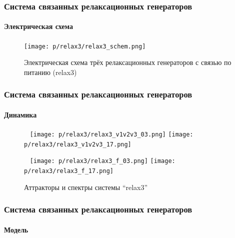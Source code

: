 \documentclass[10pt,utf8]{beamer}
\begin{document}

\begin{frame}
  \frametitle{Система связанных релаксационных генераторов}
  \framesubtitle{Электрическая схема}

  \begin{figure}[h!]
  \begin{center}
    \texttt{[image: p/relax3/relax3\_schem.png]}
  \end{center}
    \caption{Электрическая схема трёх релаксационных генераторов с связью по питанию (relax3)}
  \label{atu:f:relax3_schem}
  \end{figure}

\end{frame}




\begin{frame}
  \frametitle{Система связанных релаксационных генераторов}
  \framesubtitle{Динамика}

  \begin{figure}[h!]
    \centerline{
      {~}\hfill
      \texttt{[image: p/relax3/relax3\_v1v2v3\_03.png]}
      \hfill
      \texttt{[image: p/relax3/relax3\_v1v2v3\_17.png]}
      \hfill{~}
    }
    \centerline{
      {~}\hfill
      \texttt{[image: p/relax3/relax3\_f\_03.png]}
      \hfill
      \texttt{[image: p/relax3/relax3\_f\_17.png]}
      \hfill{~}
    }
    \caption{Аттракторы и спектры системы ``relax3''}
    \label{atu:f:relax3_dyn}
  \end{figure}



\end{frame}




\begin{frame}
  \frametitle{Система связанных релаксационных генераторов}
  \framesubtitle{Модель}


\end{frame}



\end{document}
